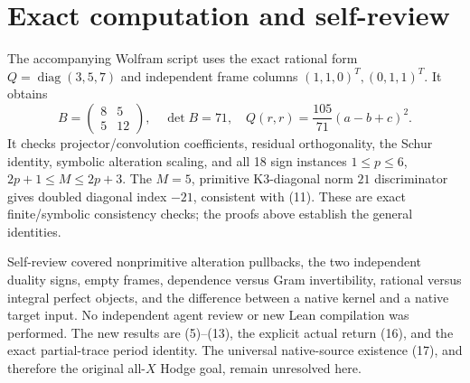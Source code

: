 \documentclass[11pt]{article}
\begin{document}
\section{Exact computation and self-review}
The accompanying Wolfram script uses the exact rational form
$Q=\operatorname{diag}(3,5,7)$ and independent frame columns
$(1,1,0)^T,(0,1,1)^T$. It obtains
\[
 B=\begin{pmatrix}8&5\\5&12\end{pmatrix},\quad
 \det B=71,\quad
 Q(r,r)=\frac{105}{71}(a-b+c)^2 .
\]
It checks projector/convolution coefficients, residual orthogonality,
the Schur identity, symbolic alteration scaling, and all 18 sign
instances $1\le p\le6$, $2p+1\le M\le2p+3$.
The $M=5$, primitive K3-diagonal norm $21$ discriminator gives
doubled diagonal index $-21$, consistent with (11).
These are exact finite/symbolic consistency checks; the proofs
above establish the general identities.

Self-review covered nonprimitive alteration pullbacks, the two
independent duality signs, empty frames, dependence versus Gram
invertibility, rational versus integral perfect objects, and the
difference between a native kernel and a native target input.
No independent agent review or new Lean compilation was performed.
The new results are (5)--(13), the explicit actual return (16),
and the exact partial-trace period identity.
The universal native-source existence (17), and therefore the
original all-$X$ Hodge goal, remain unresolved here.
\end{document}
